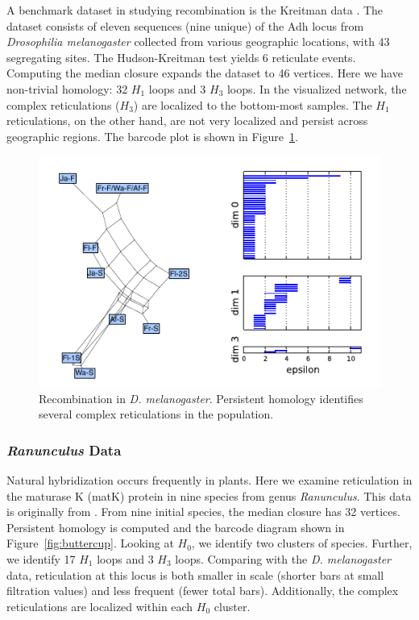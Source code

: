 A benchmark dataset in studying recombination is the Kreitman data \cite{Kreitman:1983}.
The dataset consists of eleven sequences (nine unique) of the Adh locus from \emph{Drosophilia melanogaster} collected from various geographic locations, with 43 segregating sites.
The Hudson-Kreitman test yields 6 reticulate events.
Computing the median closure expands the dataset to 46 vertices.
Here we have non-trivial homology: 32 $H_1$ loops and 3 $H_3$ loops.
In the visualized network, the complex reticulations ($H_3$) are localized to the bottom-most samples.
The $H_1$ reticulations, on the other hand, are not very localized and persist across geographic regions.
The barcode plot is shown in Figure~\ref{fig:kreitman}.

\begin{figure}
\centering
\includegraphics[width=\columnwidth]{fig/complex_construction/kreitman.pdf}
\caption[Recombination in \emph{D. melanogaster}]{Recombination in \emph{D. melanogaster}. Persistent homology identifies several complex reticulations in the population.}
\label{fig:kreitman}
\end{figure}

\subsubsection{{\textit{Ranunculus}} Data}

Natural hybridization occurs frequently in plants.
Here we examine reticulation in the maturase K (matK) protein in nine species from genus \emph{Ranunculus}.
This data is originally from \cite{Huber:2001vv}.
From nine initial species, the median closure has 32 vertices.
Persistent homology is computed and the barcode diagram shown in Figure~\ref{fig:buttercup}.
Looking at $H_0$, we identify two clusters of species.
Further, we identify 17 $H_1$ loops and 3 $H_3$ loops.
Comparing with the \emph{D. melanogaster} data, reticulation at this locus is both smaller in scale (shorter bars at small filtration values) and less frequent (fewer total bars).
Additionally, the complex reticulations are localized within each $H_0$ cluster.

